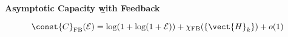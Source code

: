 \documentclass[landscape,dvips,a4]{seminar}
\begin{document}
\begin{slide}
  \begin{center}
    \textbf{\Large Asymptotic Capacity {\b{with}} Feedback}
  \end{center}
 \vspace{3mm}
\begin{whiteboxtheorem}%
  \label{thm:feedbackfadingnumber}
  \begin{equation*}
     \const{C}_{\textnormal{FB}}(\mathcal{E}) 
     = \log(1+\log(1+\mathcal{E})) + \chi_{\textnormal{FB}}(\{\vect{H}_k\}) + o(1)
  \end{equation*}

  \vspace{-2.5mm}
\end{whiteboxtheorem}
\end{slide}
\end{document}
